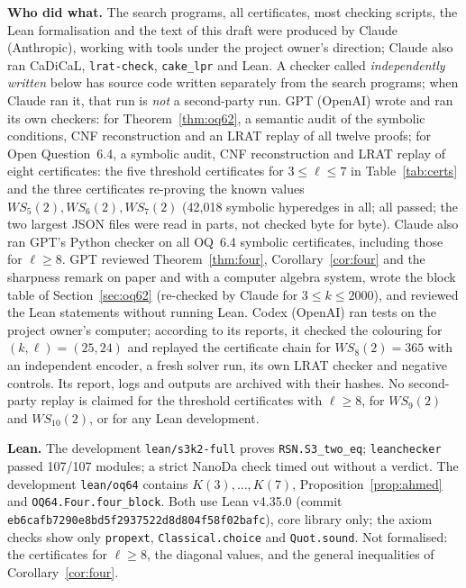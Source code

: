 \documentclass[11pt]{amsart}
\theoremstyle{definition}
\begin{document}
\smallskip\noindent\textbf{Who did what.} The search programs, all certificates, most checking scripts, the Lean formalisation and the text of this draft were produced by Claude (Anthropic), working with tools under the project owner's direction; Claude also ran CaDiCaL, \texttt{lrat-check}, \texttt{cake\_lpr} and Lean. A checker called \emph{independently written} below has source code written separately from the search programs; when Claude ran it, that run is \emph{not} a second-party run.
GPT (OpenAI) wrote and ran its own checkers: for Theorem~\ref{thm:oq62}, a semantic audit of the symbolic conditions, CNF reconstruction and an LRAT replay of all twelve proofs; for Open Question~6.4, a symbolic audit, CNF reconstruction and LRAT replay of eight certificates: the five threshold certificates for $3\le\ell\le7$ in Table~\ref{tab:certs} and the three certificates re-proving the known values $WS_5(2),WS_6(2),WS_7(2)$ (42{,}018 symbolic hyperedges in all; all passed; the two largest JSON files were read in parts, not checked byte for byte). Claude also ran GPT's Python checker on all OQ~6.4 symbolic certificates, including those for $\ell\ge8$. GPT reviewed Theorem~\ref{thm:four}, Corollary~\ref{cor:four} and the sharpness remark on paper and with a computer algebra system, wrote the block table of Section~\ref{sec:oq62} (re-checked by Claude for $3\le k\le2000$), and reviewed the Lean statements without running Lean.
Codex (OpenAI) ran tests on the project owner's computer; according to its reports, it checked the colouring for $(k,\ell)=(25,24)$ and replayed the certificate chain for $WS_8(2)=365$ with an independent encoder, a fresh solver run, its own LRAT checker and negative controls. Its report, logs and outputs are archived with their hashes. No second-party replay is claimed for the threshold certificates with $\ell\ge8$, for $WS_9(2)$ and $WS_{10}(2)$, or for any Lean development.


\smallskip\noindent\textbf{Lean.} The development \texttt{lean/s3k2-full} proves \texttt{RSN.S3\_two\_eq}; \texttt{leanchecker} passed 107/107 modules; a strict NanoDa check timed out without a verdict. The development \texttt{lean/oq64} contains $K(3),\dots,K(7)$, Proposition~\ref{prop:ahmed} and \texttt{OQ64.Four.four\_block}. Both use Lean v4.35.0 (commit \texttt{eb6cafb7290e8bd5f2937522d8d804f58f02bafc}), core library only; the axiom checks show only \texttt{propext}, \texttt{Classical.choice} and \texttt{Quot.sound}. Not formalised: the certificates for $\ell\ge8$, the diagonal values, and the general inequalities of Corollary~\ref{cor:four}.
\end{document}
